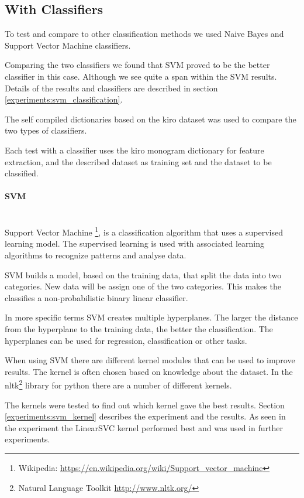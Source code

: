 \subsection{With Classifiers}\label{sentiment:classifier_classification}
To test and compare to other classification methods we used Naive Bayes and
Support Vector Machine classifiers. 

Comparing the two classifiers we found that SVM proved to be the better
classifier in this case. Although we see quite a span within the SVM results.
Details of the results and classifiers are described in section
\ref{experiments:svm_classification}. 

The self compiled dictionaries based on the kiro dataset was used to compare
the two types of classifiers. 

Each test with a classifier uses the kiro monogram dictionary for feature
extraction, and the described dataset as training set and the dataset to be
classified. 

\paragraph{SVM}\label{sentiment:svm_classification}
\hspace{0pt}\\
Support Vector Machine \footnote{Wikipedia:
\url{https://en.wikipedia.org/wiki/Support_vector_machine}}, is a classification
algorithm that uses a supervised learning model. The supervised learning is used
with associated learning algorithms to recognize patterns and analyse data. 

SVM builds a model, based on the training data, that split the data into two
categories. New data will be assign one of the two categories. This makes the
classifies a non-probabilistic binary linear classifier. 

In more specific terms SVM creates multiple hyperplanes. The larger the
distance from the hyperplane to the training data, the better the
classification. The hyperplanes can be used for regression, classification or
other tasks. 

When using SVM there are different kernel modules that can be used
to improve results. The kernel is often chosen based on knowledge about the
dataset. In the nltk\footnote{Natural Language Toolkit
\url{http://www.nltk.org/}} library for python there are a number of different
kernels. 

The kernels were tested to find out which kernel gave the best results. Section
\ref{experiments:svm_kernel} describes the experiment and the results. As
seen in the experiment the LinearSVC kernel performed best and was used in
further experiments.
%

